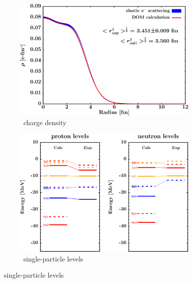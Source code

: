 \afterpage{\clearpage}
\begin{figure}[hbtp]
    \captionsetup[subfigure]{labelformat=empty}
    \centering
    \begin{subfigure}[b]{0.45\textwidth}
        \centering
        \includegraphics[width=\linewidth]{figures/ca48_chargeDensity.png}
        \caption{\caEight\ charge density}
        \label{DOMFitData_ca48_chargeDensity}
    \end{subfigure}\hspace{6pt}
    \begin{subfigure}[b]{0.45\textwidth}
        \centering
        \includegraphics[width=\linewidth]{figures/ca48_SPLevels.png}
        \caption{\caEight\ single-particle levels}
        \label{DOMFitData_ca48_SPLevels}
    \end{subfigure}\vspace{0.3in}

\end{figure}

